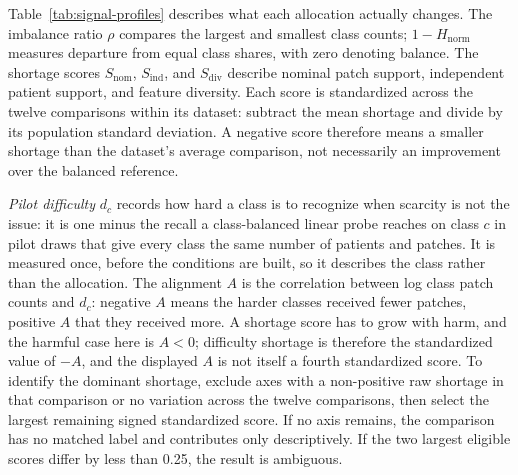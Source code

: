 \documentclass[11pt]{article}
\begin{document}
Table~\ref{tab:signal-profiles} describes what each allocation actually changes. The imbalance ratio $\rho$ compares the largest and smallest class counts; $1-H_{\mathrm{norm}}$ measures departure from equal class shares, with zero denoting balance. The shortage scores $S_{\mathrm{nom}}$, $S_{\mathrm{ind}}$, and $S_{\mathrm{div}}$ describe nominal patch support, independent patient support, and feature diversity. Each score is standardized across the twelve comparisons within its dataset: subtract the mean shortage and divide by its population standard deviation. A negative score therefore means a smaller shortage than the dataset's average comparison, not necessarily an improvement over the balanced reference.

\emph{Pilot difficulty} $d_c$ records how hard a class is to recognize when scarcity is not the issue: it is one minus the recall a class-balanced linear probe reaches on class $c$ in pilot draws that give every class the same number of patients and patches. It is measured once, before the conditions are built, so it describes the class rather than the allocation. The alignment $A$ is the correlation between log class patch counts and $d_c$: negative $A$ means the harder classes received fewer patches, positive $A$ that they received more. A shortage score has to grow with harm, and the harmful case here is $A<0$; difficulty shortage is therefore the standardized value of $-A$, and the displayed $A$ is not itself a fourth standardized score. To identify the dominant shortage, exclude axes with a non-positive raw shortage in that comparison or no variation across the twelve comparisons, then select the largest remaining signed standardized score. If no axis remains, the comparison has no matched label and contributes only descriptively. If the two largest eligible scores differ by less than \num{0.25}, the result is ambiguous.
\end{document}
